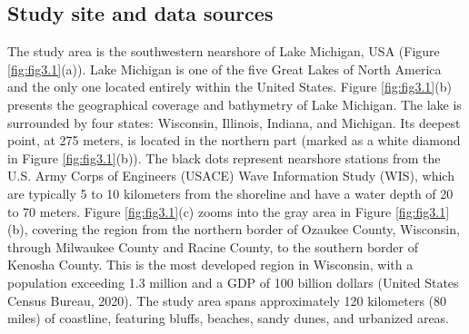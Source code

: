 \subsection{Study site and data sources}
\label{c3_Study site and data sources}
The study area is the southwestern nearshore of Lake Michigan, USA (Figure \ref{fig:fig3.1}(a)). Lake Michigan is one of the five Great Lakes of North America and the only one located entirely within the United States. Figure \ref{fig:fig3.1}(b) presents the geographical coverage and bathymetry of Lake Michigan. The lake is surrounded by four states: Wisconsin, Illinois, Indiana, and Michigan. Its deepest point, at 275 meters, is located in the northern part (marked as a white diamond in Figure \ref{fig:fig3.1}(b)). The black dots represent nearshore stations from the U.S. Army Corps of Engineers (USACE) Wave Information Study (WIS), which are typically 5 to 10 kilometers from the shoreline and have a water depth of 20 to 70 meters. Figure \ref{fig:fig3.1}(c) zooms into the gray area in Figure \ref{fig:fig3.1}(b), covering the region from the northern border of Ozaukee County, Wisconsin, through Milwaukee County and Racine County, to the southern border of Kenosha County. This is the most developed region in Wisconsin, with a population exceeding 1.3 million and a GDP of 100 billion dollars (United States Census Bureau, 2020). The study area spans approximately 120 kilometers (80 miles) of coastline, featuring bluffs, beaches, sandy dunes, and urbanized areas. 

